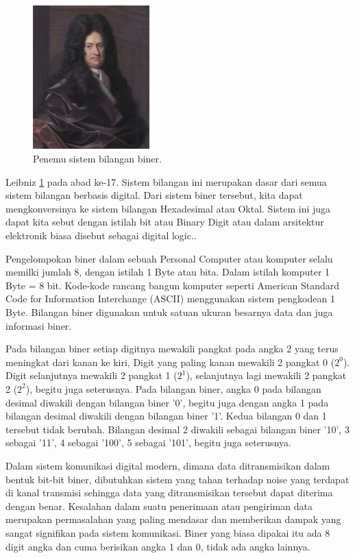 \begin{figure}[ht]
\centerline{\includegraphics[width=0.4\textwidth]{figures/gwl.jpg}}
\caption{Penemu sistem bilangan biner.}
\label{gwl}
\end{figure}

Leibniz \ref{gwl} pada abad ke-17. Sistem bilangan ini merupakan dasar dari semua sistem bilangan berbasis digital. Dari sistem biner tersebut, kita dapat mengkonversinya ke sistem bilangan Hexadesimal atau Oktal. Sistem ini juga dapat kita sebut dengan istilah bit atau Binary Digit atau dalam arsitektur elektronik biasa disebut sebagai digital logic..

Pengelompokan biner dalam sebuah Personal Computer atau komputer selalu memilki jumlah 8, dengan istilah 1 Byte atau bita. Dalam istilah komputer 1 Byte = 8 bit. Kode-kode rancang bangun komputer seperti American Standard Code for Information Interchange (ASCII) menggunakan sistem pengkodean 1 Byte. Bilangan biner digunakan untuk satuan ukuran besarnya data dan juga informasi biner.


Pada bilangan biner setiap digitnya mewakili pangkat pada angka 2 yang terus meningkat dari kanan ke kiri, Digit yang paling kanan mewakili 2 pangkat 0 ($2^0$). Digit selanjutnya mewakili 2 pangkat 1 ($2^1$), selanjutnya lagi mewakili 2 pangkat 2 ($2^2$), begitu juga seterusnya. Pada bilangan biner, angka 0 pada bilangan desimal diwakili dengan bilangan biner '0', begitu juga dengan angka 1 pada bilangan desimal diwakili dengan bilangan biner '1'. Kedua bilangan 0 dan 1 tersebut tidak berubah. Bilangan desimal 2 diwakili sebagai bilangan biner '10', 3 sebagai '11', 4 sebagai '100', 5 sebagai '101', begitu juga seterusnya.

Dalam sistem komunikasi digital modern, dimana data ditransmisikan dalam bentuk bit-bit biner, dibutuhkan sistem yang tahan terhadap noise yang terdapat di kanal transmisi sehingga data yang ditransmisikan tersebut dapat diterima dengan benar. Kesalahan dalam suatu penerimaan atau pengiriman data merupakan permasalahan yang paling mendasar dan memberikan dampak yang sangat signifikan pada sistem komunikasi. Biner yang biasa dipakai itu ada 8 digit angka dan cuma berisikan angka 1 dan 0, tidak ada angka lainnya.

